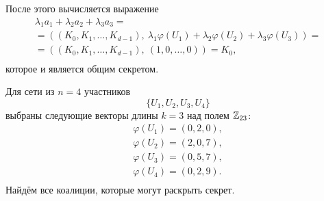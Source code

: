 После этого вычисляется выражение
\[\begin{array}{l}
    \lambda_1 a_1 + \lambda_2 a_2 + \lambda_3 a_3 = \\
    = \left( \left( K_0, K_1, \dots, K_{d-1} \right), ~ \lambda_1 \varphi(U_1) + \lambda_2 \varphi(U_2) + \lambda_3 \varphi(U_3) \right) = \\
    = \left( \left( K_0, K_1, \dots, K_{d-1} \right), ~ \left( 1, 0, \dots, 0 \right) \right) =  K_0, \\
\end{array}\]
которое и является общим секретом.

%
%
%
%

\example
Для сети из $n = 4$ участников
    \[ \{ U_1, U_2, U_3, U_4 \} \]
выбраны следующие векторы длины $k = 3$ над полем $\mathbb{Z}_{23}$:
\[ \begin{array}{l}
    \varphi(U_1) = (0,2,0), \\
    \varphi(U_2) = (2,0,7), \\
    \varphi(U_3) = (0,5,7), \\
    \varphi(U_4) = (0,2,9). \\
\end{array} \]
Найдём все коалиции, которые могут раскрыть секрет.

